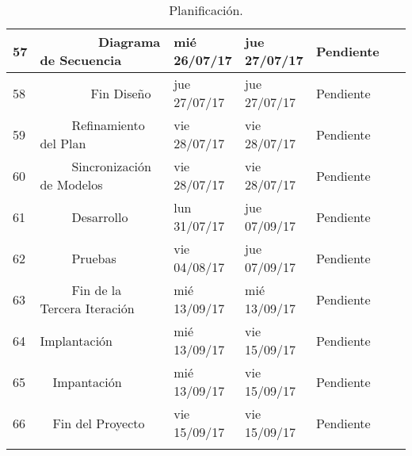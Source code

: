 \begin{center}
\begin{longtable}{ l l l l l l}
	57 &         Diagrama de Secuencia & mié 26/07/17 & jue 27/07/17 & Pendiente & \  \\ \hline
	58 &         Fin Diseño & jue 27/07/17 & jue 27/07/17 & Pendiente & \  \\ \hline
	59 &      Refinamiento del Plan & vie 28/07/17 & vie 28/07/17 & Pendiente & \  \\ \hline
	60 &      Sincronización de Modelos & vie 28/07/17 & vie 28/07/17 & Pendiente & \  \\ \hline
	61 &      Desarrollo & lun 31/07/17 & jue 07/09/17 & Pendiente & \  \\ \hline
	62 &      Pruebas & vie 04/08/17 & jue 07/09/17 & Pendiente & \  \\ \hline
	63 &      Fin de la Tercera Iteración & mié 13/09/17 & mié 13/09/17 & Pendiente & \  \\ \hline
	64 & Implantación & mié 13/09/17 & vie 15/09/17 & Pendiente & \  \\ \hline
	65 &   Impantación & mié 13/09/17 & vie 15/09/17 & Pendiente & \  \\ \hline
	66 &   Fin del Proyecto & vie 15/09/17 & vie 15/09/17 & Pendiente & \  \\ \hline
\caption{Planificación.}
\label{tab:Planificación}
\end{longtable}
\end{center}
